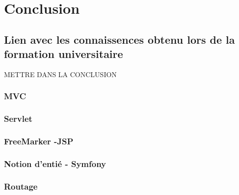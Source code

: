 \chapter{Conclusion}




\section{Lien avec les connaissences obtenu lors de la formation universitaire}
METTRE DANS LA CONCLUSION
\subsection{MVC}
\subsection{Servlet}
\subsection{FreeMarker -JSP}
\subsection{Notion d'entié - Symfony}
\subsection{Routage}
